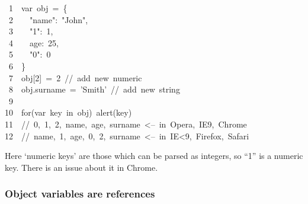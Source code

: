 \documentclass{article}
\begin{document}
\begin{mdpre}%
\noindent~{1}~~{var}~obj~=~\{\\
~{2}~~~~{"}{name}{"}:~{"}{John}{"},\\
~{3}~~~~{"}{1}{"}:~{1},\\
~{4}~~~~age:~{25},\\
~{5}~~~~{"}{0}{"}:~{0}\\
~{6}~~\}\\
~{7}~~obj{}[{2}]~=~{2}~{//~add~new~numeric}\\
~{8}~~obj.surname~=~{'}{Smith}{'}~{//~add~new~string}\\
~{9}\\
{10}~~{for}({var}~key~{in}~obj)~alert(key)\\
{11}~~{//~0,~1,~2,~name,~age,~surname~\textless{}--~in~Opera,~IE9,~Chrome}\\
{12}~~{//~name,~1,~age,~0,~2,~surname~\textless{}--~in~IE\textless{}9,~Firefox,~Safari}%
\end{mdpre}\noindent{}Here \textquoteleft{}numeric keys\textquoteright{} are those which can be parsed as integers, so \textquotedblleft{}1\textquotedblright{} is a numeric key. There is an issue about it in Chrome.
 

\subsubsection{Object variables are references}\label{sec3-object-variables-are-references}%
\end{document}
